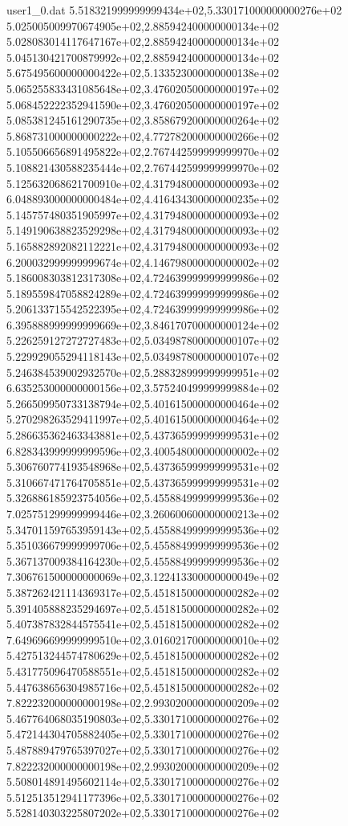 \begin{filecontents}{user1_0.dat}
5.518321999999999434e+02,5.330171000000000276e+02
5.025005009970674905e+02,2.885942400000000134e+02
5.028083014117647167e+02,2.885942400000000134e+02
5.045130421700879992e+02,2.885942400000000134e+02
5.675495600000000422e+02,5.133523000000000138e+02
5.065255833431085648e+02,3.476020500000000197e+02
5.068452222352941590e+02,3.476020500000000197e+02
5.085381245161290735e+02,3.858679200000000264e+02
5.868731000000000222e+02,4.772782000000000266e+02
5.105506656891495822e+02,2.767442599999999970e+02
5.108821430588235444e+02,2.767442599999999970e+02
5.125632068621700910e+02,4.317948000000000093e+02
6.048893000000000484e+02,4.416434300000000235e+02
5.145757480351905997e+02,4.317948000000000093e+02
5.149190638823529298e+02,4.317948000000000093e+02
5.165882892082112221e+02,4.317948000000000093e+02
6.200032999999999674e+02,4.146798000000000002e+02
5.186008303812317308e+02,4.724639999999999986e+02
5.189559847058824289e+02,4.724639999999999986e+02
5.206133715542522395e+02,4.724639999999999986e+02
6.395888999999999669e+02,3.846170700000000124e+02
5.226259127272727483e+02,5.034987800000000107e+02
5.229929055294118143e+02,5.034987800000000107e+02
5.246384539002932570e+02,5.288328999999999951e+02
6.635253000000000156e+02,3.575240499999999884e+02
5.266509950733138794e+02,5.401615000000000464e+02
5.270298263529411997e+02,5.401615000000000464e+02
5.286635362463343881e+02,5.437365999999999531e+02
6.828343999999999596e+02,3.400548000000000002e+02
5.306760774193548968e+02,5.437365999999999531e+02
5.310667471764705851e+02,5.437365999999999531e+02
5.326886185923754056e+02,5.455884999999999536e+02
7.025751299999999446e+02,3.260600600000000213e+02
5.347011597653959143e+02,5.455884999999999536e+02
5.351036679999999706e+02,5.455884999999999536e+02
5.367137009384164230e+02,5.455884999999999536e+02
7.306761500000000069e+02,3.122413300000000049e+02
5.387262421114369317e+02,5.451815000000000282e+02
5.391405888235294697e+02,5.451815000000000282e+02
5.407387832844575541e+02,5.451815000000000282e+02
7.649696699999999510e+02,3.016021700000000010e+02
5.427513244574780629e+02,5.451815000000000282e+02
5.431775096470588551e+02,5.451815000000000282e+02
5.447638656304985716e+02,5.451815000000000282e+02
7.822232000000000198e+02,2.993020000000000209e+02
5.467764068035190803e+02,5.330171000000000276e+02
5.472144304705882405e+02,5.330171000000000276e+02
5.487889479765397027e+02,5.330171000000000276e+02
7.822232000000000198e+02,2.993020000000000209e+02
5.508014891495602114e+02,5.330171000000000276e+02
5.512513512941177396e+02,5.330171000000000276e+02
5.528140303225807202e+02,5.330171000000000276e+02

\end{filecontents}
